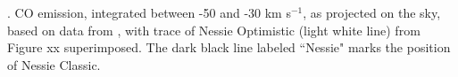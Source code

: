 \textbf{\label{fig:COarm}}. CO emission, integrated between -50 and -30 km s$^{-1}$, as projected on the sky, based on data from \citep{Dame2001}, with trace of Nessie Optimistic (light white line) from Figure xx superimposed.    The dark black line labeled ``Nessie" marks the position of Nessie Classic.